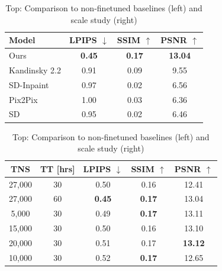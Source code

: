 \documentclass[11pt,twocolumn]{article}
\begin{document}
\begin{table}[t]
  \centering
  \begin{subtable}[t]{0.48\textwidth}
    \vspace{0pt}
    \centering
    \begin{tabular}{l|ccc}
      \toprule
      \textbf{Model} & \textbf{LPIPS} $\downarrow$ & \textbf{SSIM} $\uparrow$ & \textbf{PSNR} $\uparrow$ \\
      \midrule
      Ours         & \textbf{0.45} & \textbf{0.17} & \textbf{13.04} \\
      Kandinsky 2.2 & 0.91 & 0.09 & 9.55 \\
      SD-Inpaint   & 0.97 & 0.02 & 6.56 \\
      Pix2Pix      & 1.00 & 0.03 & 6.36 \\
      SD           & 0.95 & 0.02 & 6.46 \\
      \bottomrule
    \end{tabular}
    \label{tab:best-vs-baseline}
  \end{subtable}
  \hfill
  \begin{subtable}[t]{0.48\textwidth}
    \vspace{0pt}
    \centering
    \begin{tabular}{cc|ccc}
      \toprule
      \textbf{TNS} & \textbf{TT [hrs]} & \textbf{LPIPS} $\downarrow$ & \textbf{SSIM} $\uparrow$ & \textbf{PSNR} $\uparrow$ \\
      \midrule
      27,000 & 30 & 0.50 & 0.16 & 12.41 \\
      \midrule
      27,000 & 60 & \textbf{0.45} & \textbf{0.17} & 13.04 \\
      5,000  & 30 & 0.49 & \textbf{0.17} & 13.11 \\
      15,000 & 30 & 0.50 & 0.16 & 13.10 \\
      20,000 & 30 & 0.51 & 0.17 & \textbf{13.12} \\
      10,000 & 30 & 0.52 & \textbf{0.17} & 12.65 \\
      \bottomrule
    \end{tabular}
    \label{tab:scale-study}
  \end{subtable}
  \caption{Top: Comparison to non-finetuned baselines (left) and scale study (right)}
\end{table}

\vspace{1em}
\end{document}
